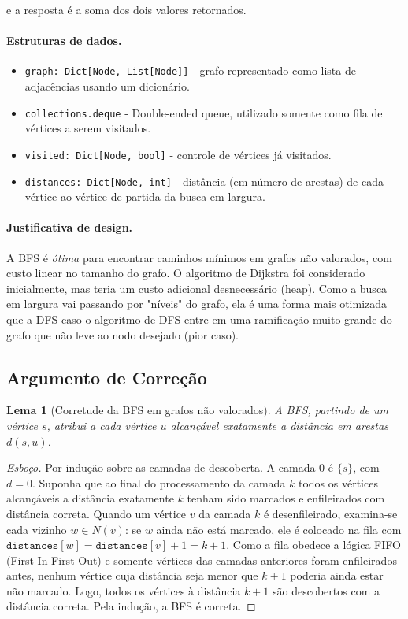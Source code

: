 \documentclass[11pt,a4paper]{article}
\newtheorem{lemma}{Lema}
\begin{document}
\noindent
e a resposta é a soma dos dois valores retornados.

\paragraph{Estruturas de dados.}
\begin{itemize}
    \item \texttt{graph: Dict[Node, List[Node]]} - grafo representado como lista de adjacências
    usando um dicionário.
    \item \texttt{collections.deque} - Double-ended queue, utilizado somente como fila de vértices a serem visitados.
    \item \texttt{visited: Dict[Node, bool]} - controle de vértices
    já visitados.
    \item \texttt{distances: Dict[Node, int]} - distância (em número de arestas)
    de cada vértice ao vértice de partida da busca em largura.
\end{itemize}

\paragraph{Justificativa de design.} A BFS é \emph{ótima} para encontrar
caminhos mínimos em grafos não valorados, com custo linear no tamanho
do grafo. O algoritmo de Dijkstra foi considerado inicialmente, mas teria um custo
adicional desnecessário (heap). Como a busca em largura vai passando por "níveis" do grafo, ela é uma forma mais otimizada que a DFS caso o algoritmo de DFS entre em uma ramificação muito grande do grafo que não leve ao nodo desejado (pior caso).

\subsection{Argumento de Correção}
\label{sec:correcao1}

\begin{lemma}[Corretude da BFS em grafos não valorados]
\label{lem:bfs}
A BFS, partindo de um vértice $s$, atribui a cada vértice $u$ alcançável
exatamente a distância em arestas $d(s,u)$.
\end{lemma}

\begin{proof}[Esboço]
Por indução sobre as camadas de descoberta. A camada $0$ é $\{s\}$,
com $d=0$. Suponha que ao final do processamento da camada $k$ todos
os vértices alcançáveis a distância exatamente $k$ tenham sido marcados
e enfileirados com distância correta. Quando um vértice $v$ da camada
$k$ é desenfileirado, examina-se cada vizinho $w \in N(v)$: se $w$
ainda não está marcado, ele é colocado na fila com
$\texttt{distances}[w] = \texttt{distances}[v] + 1 = k+1$. Como a fila
obedece a lógica FIFO (First-In-First-Out) e somente vértices das camadas anteriores foram enfileirados
antes, nenhum vértice cuja distância seja menor que $k+1$ poderia
ainda estar não marcado. Logo, todos os vértices à distância $k+1$ são
descobertos com a distância correta. Pela indução, a BFS é correta.
\end{proof}
\end{document}
